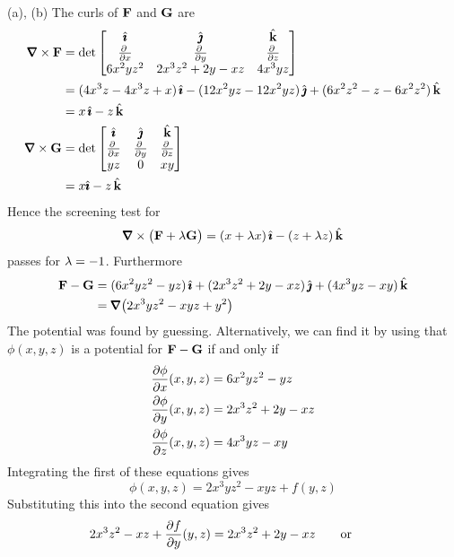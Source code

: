 \begin{solution}
(a), (b) The curls of $\mathbf{F}$ and $\mathbf{G}$ are
\begin{align*}
\vnabla\times\vF
&= \det\left[\begin{matrix}
                       \hi &       \hj        &   \hk \\
               \pdiff{}{x} &   \pdiff{}{y}    &  \pdiff{}{z} \\
                  6x^2yz^2 & 2x^3z^2 + 2y - xz &  4x^3yz
            \end{matrix}\right] \\
&=(4x^3z-4x^3z+x)\,\hi-(12x^2yz-12x^2yz)\,\hj+(6x^2z^2-z-6x^2z^2)\,\hk \\
&=x\,\hi-z\,\hk\\
\vnabla\times\vG
&=\det\left[\begin{matrix}
                   \hi       &   \hj       &  \hk \\
                 \pdiff{}{x} & \pdiff{}{y} &  \pdiff{}{z} \\
                          yz &      0      & xy
\end{matrix}\right] \\
&=x\hi-z\,\hk
\end{align*}
Hence the screening test for
\begin{equation*}
\vnabla\times\big(\vF+\la\vG\big)=(x+\la x)\,\hi-(z+\la z)\,\hk
\end{equation*}
passes for $\lambda=-1$. Furthermore
\begin{align*}
\vF-\vG &=(6x^2yz^2-yz)\,\hi+(2x^3z^2 + 2y - xz)\,\hj+(4x^3yz-xy)\,\hk \\
&=\vnabla\big(2x^3yz^2-xyz+y^2\big)
\end{align*}
The potential was found by guessing. Alternatively,
we can find it by using that
$\phi(x,y,z)$ is a potential for $\mathbf{F}-\mathbf{G}$ 
if and only if
\begin{align*}
\pdiff{\phi}{x}(x,y,z) &= 6x^2yz^2-yz \\
\pdiff{\phi}{y}(x,y,z) &= 2x^3z^2 + 2y - xz \\
\pdiff{\phi}{z}(x,y,z) &= 4x^3yz-xy
\end{align*}
Integrating the first of these equations gives
\begin{equation*}
\phi(x,y,z) = 2x^3yz^2-xyz + f(y,z)
\end{equation*}
Substituting this into the second equation gives 
\begin{equation*}
2x^3z^2-xz + \pdiff{f}{y}(y,z) 
   = 2x^3z^2 + 2y - xz \qquad\hbox{or}\qquad 

\end{equation*}
\end{solution}
